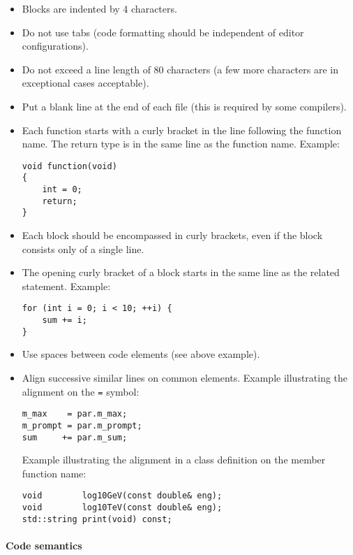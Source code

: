 \documentclass{article}[12pt,a4]
\begin{document}
\begin{itemize}
\item Blocks are indented by 4 characters.
\item Do not use tabs (code formatting should be independent of editor configurations).
\item Do not exceed a line length of 80 characters (a few more characters are in exceptional cases acceptable).
\item Put a blank line at the end of each file (this is required by some compilers).
\item Each function starts with a curly bracket in the line following the function name.
The return type is in the same line as the function name. Example:
\begin{verbatim}
void function(void)
{
    int = 0;
    return;
}
\end{verbatim}
\item Each block should be encompassed in curly brackets, even if the block consists only
of a single line.
\item The opening curly bracket of a block starts in the same line as the related statement. 
Example:
\begin{verbatim}
for (int i = 0; i < 10; ++i) {
    sum += i;
}
\end{verbatim}
\item Use spaces between code elements (see above example).
\item Align successive similar lines on common elements.
Example illustrating the alignment on the {\tt =} symbol:
\begin{verbatim}
m_max    = par.m_max;
m_prompt = par.m_prompt;
sum     += par.m_sum;
\end{verbatim}
Example illustrating the alignment in a class definition on the member function name:
\begin{verbatim}
void        log10GeV(const double& eng);
void        log10TeV(const double& eng);
std::string print(void) const;
\end{verbatim}
\end{itemize}


\paragraph{Code semantics}
\end{document}
